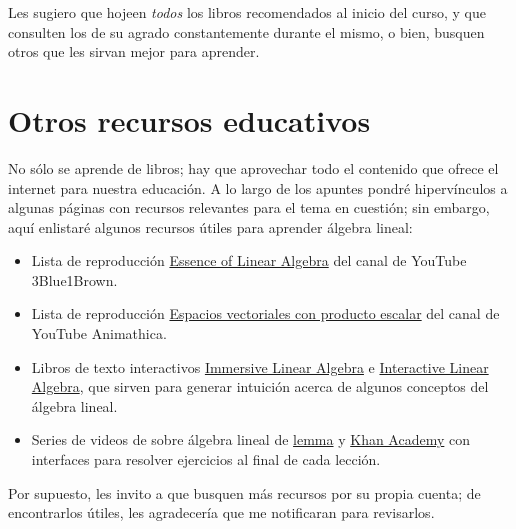 Les sugiero que hojeen \emph{todos} los libros recomendados al inicio del curso, y que consulten los de su agrado constantemente durante el mismo, o bien, busquen otros que les sirvan mejor para aprender.

\section*{Otros recursos educativos}

No sólo se aprende de libros; hay que aprovechar todo el contenido que ofrece el internet para nuestra educación. A lo largo de los apuntes pondré hipervínculos a algunas páginas con recursos relevantes para el tema en cuestión; sin embargo, aquí enlistaré algunos recursos útiles para aprender álgebra lineal:

\begin{itemize}
    \item Lista de reproducción \href{https://www.youtube.com/watch?v=fNk_zzaMoSs&list=PLZHQObOWTQDPD3MizzM2xVFitgF8hE_ab}{Essence of Linear Algebra} del canal de YouTube 3Blue1Brown.
    \item Lista de reproducción \href{https://youtube.com/playlist?list=PL91agCMqt_mdAgHZkxyn-tscoNpu7ZHvl}{Espacios vectoriales con producto escalar} del canal de YouTube Animathica.
    \item Libros de texto interactivos \href{{http://immersivemath.com/ila/learnmore.html}}{Immersive Linear Algebra} e \href{https://textbooks.math.gatech.edu/ila/index2.html}{Interactive Linear Algebra}, que sirven para generar intuición acerca de algunos conceptos del álgebra lineal.
    \item Series de videos de sobre álgebra lineal de \href{https://www.lem.ma/books/AIApowDnjlDDQrp-uOZVow/landing}{lemma} y \href{https://www.khanacademy.org/math/linear-algebra}{Khan Academy} con interfaces para resolver ejercicios al final de cada lección.
\end{itemize}

Por supuesto, les invito a que busquen más recursos por su propia cuenta; de encontrarlos útiles, les agradecería que me notificaran para revisarlos.
